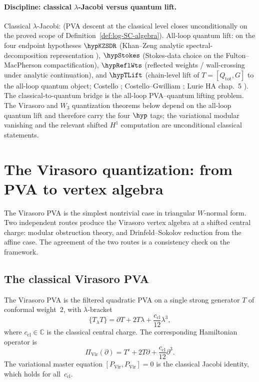 \label{ch:modular-pva-quantization-frontier}

\paragraph{Discipline: classical $\lambda$-Jacobi versus quantum lift.}
Classical $\lambda$-Jacobi: \ClaimStatusProvedHere{} (PVA descent at
the classical level closes unconditionally on the proved scope of
Definition~\ref{def:log-SC-algebra}). All-loop quantum lift:
\ClaimStatusConditional{} on the four endpoint hypotheses
$\hypKZSDR$ (Khan--Zeng analytic spectral-decomposition representation
\cite{KZ25}), $\hypStokes$ (Stokes-data choice on the Fulton--MacPherson
compactification), $\hypReflWts$ (reflected weights / wall-crossing
under analytic continuation), and $\hypTLift$ (chain-level lift of
$T = [Q_{\mathrm{tot}}, G]$ to the all-loop quantum object;
Costello \cite{Costello2011Renorm}; Costello--Gwilliam \cite{CG17};
Lurie HA chap.~5 \cite{LurieHA}). The classical-to-quantum bridge is
the all-loop PVA--quantum lifting problem. The Virasoro and $W_3$
quantization theorems below depend on the all-loop quantum lift and
therefore carry the four $\hyp$ tags; the variational modular
vanishing and the relevant shifted $H^1$ computation are unconditional
classical statements.

\section{The Virasoro quantization: from PVA to vertex algebra}
\label{sec:virasoro-quantization}

The Virasoro PVA is the simplest nontrivial case in triangular
$W$-normal form. Two independent routes produce the Virasoro vertex
algebra at a shifted central charge: modular obstruction theory, and
Drinfeld--Sokolov reduction from the affine case. The agreement of the
two routes is a consistency check on the framework.

\subsection{The classical Virasoro PVA}
\label{subsec:virasoro-classical-pva}

The Virasoro PVA is the filtered quadratic PVA on a single strong generator
$T$ of conformal weight~$2$, with $\lambda$-bracket
\begin{equation}\label{eq:virasoro-pva-bracket}
\{T_\lambda T\} = \partial T + 2T\lambda + \frac{c_{\mathrm{cl}}}{12}\lambda^3,
\end{equation}
where $c_{\mathrm{cl}}\in\mathbb C$ is the classical central charge.
The corresponding Hamiltonian operator is
\[
\Pi_{\mathrm{Vir}}(\partial) = T' + 2T\partial + \frac{c_{\mathrm{cl}}}{12}\partial^3.
\]
The variational master equation $[P_{\mathrm{Vir}},P_{\mathrm{Vir}}]=0$ is
the classical Jacobi identity, which holds for all~$c_{\mathrm{cl}}$.

